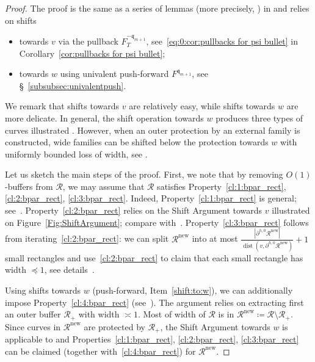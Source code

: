 \documentclass{amsart}
\makeatletter
\newcommand{\1}{{\mathbb 1 }}
\newcommand{\setword}[2]{%
  \phantomsection
  #1\def\@currentlabel{\unexpanded{#1}}\label{#2}%
}
\newcommand\RR{\mathcal{R}}
\newcommand{\qq}{\mathfrak{q}}
\newcommand\new{{\operatorname{new}}}
\theoremstyle{remark}
\numberwithin{equation}{section}
\theoremstyle{definition}
\newcommand{\dist}{\operatorname{dist}}
\makeatother
\begin{document}
\begin{proof}
    The proof is the same as a series of lemmas (more precisely, \cite[Lemma~4.4, Lemma~4.5, Lemma~4.10]{DL22}) in \cite[\S 4]{DL22} and relies on shifts
\begin{itemize}
   \item[\setword{(v)}{shift:to:v}] towards $v$ via the pullback $F^{-\qq_{m+1}}_T$, see~\eqref{eq:0:cor:pullbacks for psi bullet} in  Corollary~\ref{cor:pullbacks for psi bullet};
  \item[\setword{(w)}{shift:to:w}] towards $w$ using univalent push-forward $F^{\qq_{m+1}}$, see \S~\ref{subsubsec:univalentpush}.
\end{itemize}
We remark that shifts towards $v$ are relatively easy, while shifts towards $w$ are more delicate. In general, the shift operation towards $w$ produces three types of curves illustrated \cite[Figure~12]{DL22}. However, when an outer protection by an external family is constructed, wide families can be shifted below the protection towards $w$ with uniformly bounded loss of width, see \cite[Lemma 4.9]{DL22}.

    Let us sketch the main steps of the proof.
    First, we note that by removing $O(1)$-buffers from $\RR$, we may assume that $\RR$ satisfies Property~\ref{cl:1:bpar_rect}, \ref{cl:2:bpar_rect}, \ref{cl:3:bpar_rect}. 
    Indeed, Property~\ref{cl:1:bpar_rect} is general; see~\cite[Lemma A.5]{DL22}. Property~\ref{cl:2:bpar_rect} relies on the Shift Argument towards $v$ illustrated on Figure~\ref{Fig:ShiftArgument}; compare with~\cite[Lemmas 4.4]{DL22}. Property~\ref{cl:3:bpar_rect} follows from iterating~\ref{cl:2:bpar_rect}: we can split $\RR^\new$ into at most $\frac{|\partial^{h,0} \RR^\new|}{\dist(v, \partial^{h,0} \RR^\new)} + 1$ small rectangles and use~\ref{cl:2:bpar_rect} to claim that each small rectangle has width $\preceq 1$, see details~\cite[Lemmas 4.5]{DL22}. 

    Using shifts towards $w$ (push-forward, Item~\ref{shift:to:w}), we can additionally impose Property~\ref{cl:4:bpar_rect} (see~\cite[Lemmas 4.10]{DL22}).
    The argument relies on extracting first an outer buffer $\RR_+$ with width $\asymp 1$. Most of width of $\RR$ is in $\RR^\new\coloneqq \RR\setminus \RR_+$. Since curves in $\RR^\new$ are protected by $\RR_+$, the Shift Argument towards $w$ is applicable to and Properties~\ref{cl:1:bpar_rect}, \ref{cl:2:bpar_rect}, \ref{cl:3:bpar_rect} can be claimed (together with~\ref{cl:4:bpar_rect}) for $\RR^\new$.
\end{proof}
\end{document}
